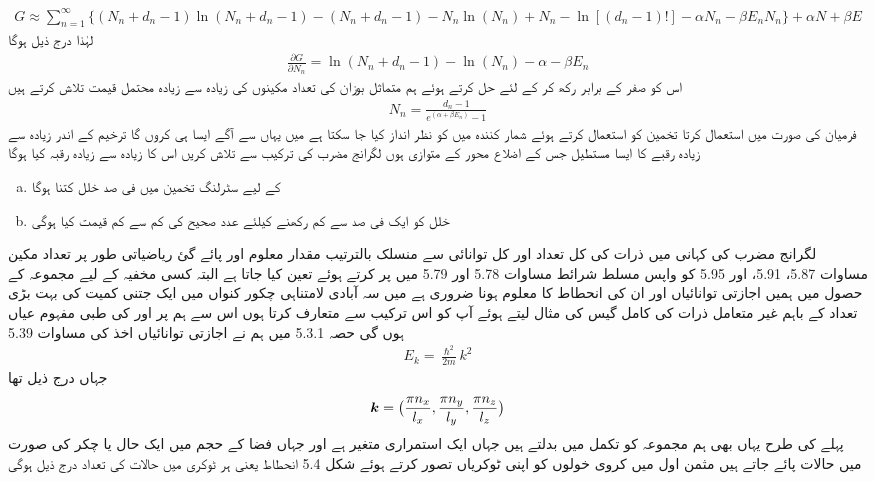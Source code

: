 \begin{align}
G \approx \sum_{n = 1}^{\infty} \{ (N_n + d_n - 1) \ln(N_n + d_n - 1) - (N_n + d_n - 1) - N_n \ln(N_n) + N_n - \ln[(d_n - 1) !] - \alpha N_n - \beta E_n N_n \} + \alpha N + \beta E
\end{align}
لہٰذا درج ذیل ہوگا 
\begin{align}
\frac{\partial G}{\partial N_n} = \ln(N_n + d_n - 1) - \ln(N_n) - \alpha - \beta E_n
\end{align}
اس کو صفر کے برابر رکھ کر  کے لئے حل کرتے ہوئے ہم متماثل بوزان کی تعداد مکینوں کی زیادہ سے زیادہ محتمل قیمت تلاش کرتے ہیں 
\begin{align}
N_n = \frac{d_n - 1}{e^{(\alpha + \beta E_n)} - 1}
\end{align}
فرمیان کی صورت میں استعمال کرتا تخمین کو استعمال کرتے ہوئے شمار کنندہ میں  کو نظر انداز کیا جا سکتا ہے میں یہاں سے آگے ایسا ہی کروں گا 
ترخیم  کے اندر زیادہ سے زیادہ رقبے کا ایسا مستطیل جس کے اضلاع محور کے متوازی ہوں لگرانج مضرب کی ترکیب سے تلاش کریں اس کا زیادہ سے زیادہ رقبہ کیا ہوگا 
\begin{enumerate}[a.]
\item
{} کے لیے سٹرلنگ تخمین میں فی صد خلل کتنا ہوگا 
\item
خلل کو ایک فی صد سے کم رکھنے کیلئے عدد صحیح  کی کم سے کم قیمت کیا ہوگی 
\end{enumerate}
لگرانج مضرب کی کہانی میں ذرات کی کل تعداد اور کل توانائی سے منسلک بالترتیب مقدار معلوم  اور  پائے گئ ریاضیاتی طور پر تعداد مکین مساوات 5.87، 5.91، اور 5.95 کو واپس مسلط شرائط مساوات 5.78 اور 5.79 میں پر کرتے ہوئے تعین کیا جاتا ہے البتہ کسی مخفیہ  کے لیے مجموعہ کے حصول میں ہمیں اجازتی توانائیاں    اور ان کی انحطاط  کا معلوم ہونا ضروری ہے میں سہ آبادی لامتناہی چکور کنواں میں ایک جتنی کمیت کی بہت بڑی تعداد کے باہم غیر متعامل ذرات کی کامل گیس کی مثال لیتے ہوئے آپ کو اس ترکیب سے متعارف کرتا ہوں اس سے ہم پر  اور  کی طبی مفہوم عیاں ہوں گی حصہ 5.3.1 میں ہم نے اجازتی توانائیاں اخذ کی مساوات 5.39 
\begin{align}
E_k = \frac{\hslash^2}{2 m} k^2
\end{align}
جہاں درج ذیل تھا 
\begin{align*}
{\ensuremath{{\boldsymbol{k}}}} = \big ( \frac{\pi n_x}{l_x} , \frac{\pi n_y}{l_y} , \frac{\pi n_z}{l_z} \big )
\end{align*}
پہلے کی طرح یہاں بھی ہم مجموعہ کو تکمل میں بدلتے ہیں جہاں  ایک استمراری متغیر ہے اور جہاں  فضا کے  حجم میں ایک حال یا چکر  کی صورت میں  حالات پائے جاتے ہیں مثمن اول میں کروی خولوں  کو اپنی  ٹوکریاں تصور کرتے ہوئے شکل 5.4 انحطاط یعنی ہر ٹوکری میں حالات کی تعداد درج ذیل ہوگی 
